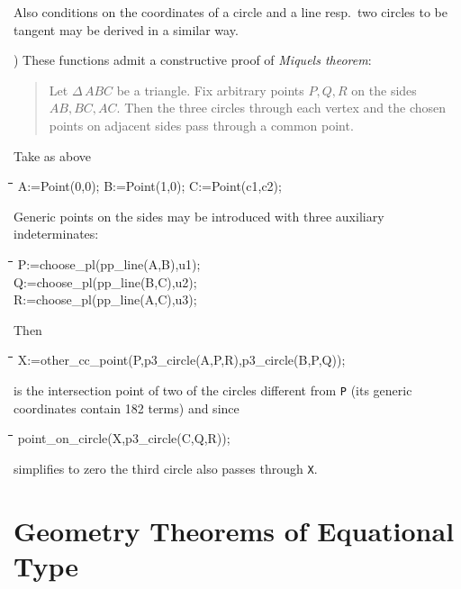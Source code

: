 \documentclass{article}
\newenvironment{code}{\tt \begin{tabbing}
\hspace*{1cm}\=\hspace*{1cm}\=\hspace*{1cm}\=
\hspace*{1cm}\=\hspace*{1cm}\=\kill
}{\end{tabbing}}
\begin{document}
Also conditions on the coordinates of a circle and a line resp.\ two
circles to be tangent may be derived in a similar way.
\medskip

) These functions admit a constructive proof of {\em
Miquels theorem}:
\begin{quote} Let $\Delta\,ABC$ be a triangle. Fix arbitrary points
$P,Q,R$ on the sides $AB, BC, AC$. Then the three circles through each
vertex and the chosen points on adjacent sides pass through a common
point.
\end{quote}
Take as above 
\begin{code}\>
A:=Point(0,0); B:=Point(1,0); C:=Point(c1,c2);
\end{code}
Generic points on the sides may be introduced with three auxiliary
indeterminates: 
\begin{code}\>\+
P:=choose\_pl(pp\_line(A,B),u1);\\
Q:=choose\_pl(pp\_line(B,C),u2);\\
R:=choose\_pl(pp\_line(A,C),u3);
\end{code}
Then 
\begin{code}\>
X:=other\_cc\_point(P,p3\_circle(A,P,R),p3\_circle(B,P,Q));
\end{code}
is the intersection point of two of the circles different from {\tt P}
(its generic coordinates contain 182 terms) and since
\begin{code}\>
point\_on\_circle(X,p3\_circle(C,Q,R));
\end{code}
simplifies to zero the third circle also passes through {\tt X}.

\section{Geometry Theorems of Equational Type}
\end{document}
